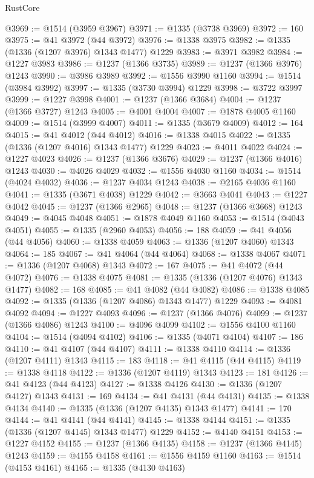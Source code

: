 \begin{lexlean}{RustCore}
\begin{coremodule}
@3969 := @1514 (@3959 @3967)
@3971 := @1335 (@3738 @3969)
@3972 := 160
@3975 := @41 @3972 (@44 @3972)
@3976 := @1338 @3975
@3982 := @1335 (@1336 (@1207 @3976) @1343 @1477) @1229
@3983 := @3971 @3982
@3984 := @1227 @3983
@3986 := @1237 (@1366 @3735)
@3989 := @1237 (@1366 @3976) @1243
@3990 := @3986 @3989
@3992 := @1556 @3990 @1160
@3994 := @1514 (@3984 @3992)
@3997 := @1335 (@3730 @3994) @1229
@3998 := @3722 @3997
@3999 := @1227 @3998
@4001 := @1237 (@1366 @3684)
@4004 := @1237 (@1366 @3727) @1243
@4005 := @4001 @4004
@4007 := @1878 @4005 @1160
@4009 := @1514 (@3999 @4007)
@4011 := @1335 (@3679 @4009)
@4012 := 164
@4015 := @41 @4012 (@44 @4012)
@4016 := @1338 @4015
@4022 := @1335 (@1336 (@1207 @4016) @1343 @1477) @1229
@4023 := @4011 @4022
@4024 := @1227 @4023
@4026 := @1237 (@1366 @3676)
@4029 := @1237 (@1366 @4016) @1243
@4030 := @4026 @4029
@4032 := @1556 @4030 @1160
@4034 := @1514 (@4024 @4032)
@4036 := @1237 @4034 @1243
@4038 := @2165 @4036 @1160
@4041 := @1335 (@3671 @4038) @1229
@4042 := @3663 @4041
@4043 := @1227 @4042
@4045 := @1237 (@1366 @2965)
@4048 := @1237 (@1366 @3668) @1243
@4049 := @4045 @4048
@4051 := @1878 @4049 @1160
@4053 := @1514 (@4043 @4051)
@4055 := @1335 (@2960 @4053)
@4056 := 188
@4059 := @41 @4056 (@44 @4056)
@4060 := @1338 @4059
@4063 := @1336 (@1207 @4060) @1343
@4064 := 185
@4067 := @41 @4064 (@44 @4064)
@4068 := @1338 @4067
@4071 := @1336 (@1207 @4068) @1343
@4072 := 167
@4075 := @41 @4072 (@44 @4072)
@4076 := @1338 @4075
@4081 := @1335 (@1336 (@1207 @4076) @1343 @1477)
@4082 := 168
@4085 := @41 @4082 (@44 @4082)
@4086 := @1338 @4085
@4092 := @1335 (@1336 (@1207 @4086) @1343 @1477) @1229
@4093 := @4081 @4092
@4094 := @1227 @4093
@4096 := @1237 (@1366 @4076)
@4099 := @1237 (@1366 @4086) @1243
@4100 := @4096 @4099
@4102 := @1556 @4100 @1160
@4104 := @1514 (@4094 @4102)
@4106 := @1335 (@4071 @4104)
@4107 := 186
@4110 := @41 @4107 (@44 @4107)
@4111 := @1338 @4110
@4114 := @1336 (@1207 @4111) @1343
@4115 := 183
@4118 := @41 @4115 (@44 @4115)
@4119 := @1338 @4118
@4122 := @1336 (@1207 @4119) @1343
@4123 := 181
@4126 := @41 @4123 (@44 @4123)
@4127 := @1338 @4126
@4130 := @1336 (@1207 @4127) @1343
@4131 := 169
@4134 := @41 @4131 (@44 @4131)
@4135 := @1338 @4134
@4140 := @1335 (@1336 (@1207 @4135) @1343 @1477)
@4141 := 170
@4144 := @41 @4141 (@44 @4141)
@4145 := @1338 @4144
@4151 := @1335 (@1336 (@1207 @4145) @1343 @1477) @1229
@4152 := @4140 @4151
@4153 := @1227 @4152
@4155 := @1237 (@1366 @4135)
@4158 := @1237 (@1366 @4145) @1243
@4159 := @4155 @4158
@4161 := @1556 @4159 @1160
@4163 := @1514 (@4153 @4161)
@4165 := @1335 (@4130 @4163)

\end{coremodule}
\end{lexlean}

